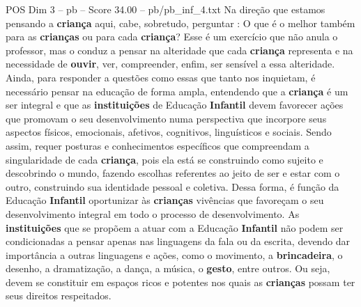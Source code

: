 \begin{textsample}{POS Dim 3 – pb – Score 34.00 – pb/pb\_inf\_4.txt}
Na direção que estamos pensando a \textbf{criança} aqui, cabe, sobretudo, perguntar : O que é o melhor também para as \textbf{crianças} ou para cada \textbf{criança}?
Esse é um exercício que não anula o professor, mas o conduz a pensar na alteridade que cada \textbf{criança} representa e na necessidade de \textbf{ouvir}, ver, compreender, enfim, ser sensível a essa alteridade.
Ainda, para responder a questões como essas que tanto nos inquietam, é necessário pensar na educação de forma ampla, entendendo que a \textbf{criança} é um ser integral e que as \textbf{instituições} de Educação \textbf{Infantil} devem favorecer ações que promovam o seu desenvolvimento numa perspectiva que incorpore seus aspectos físicos, emocionais, afetivos, cognitivos, linguísticos e sociais.
Sendo assim, requer posturas e conhecimentos específicos que compreendam a singularidade de cada \textbf{criança}, pois ela está se construindo como sujeito e descobrindo o mundo, fazendo escolhas referentes ao jeito de ser e estar com o outro, construindo sua identidade pessoal e coletiva.
Dessa forma, é função da Educação \textbf{Infantil} oportunizar às \textbf{crianças} vivências que favoreçam o seu desenvolvimento integral em todo o processo de desenvolvimento.
As \textbf{instituições} que se propõem a atuar com a Educação \textbf{Infantil} não podem ser condicionadas a pensar apenas nas linguagens da fala ou da escrita, devendo dar importância a outras linguagens e ações, como o movimento, a \textbf{brincadeira}, o desenho, a dramatização, a dança, a música, o \textbf{gesto}, entre outros.
Ou seja, devem se constituir em espaços ricos e potentes nos quais as \textbf{crianças} possam ter seus direitos respeitados.

\end{textsample}
